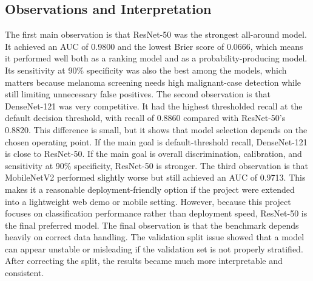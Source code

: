 \documentclass{article}
\begin{document}
\subsection{Observations and Interpretation}
The first main observation is that ResNet-50 was the strongest all-around model. It achieved an
AUC of 0.9800 and the lowest Brier score of 0.0666, which means it performed well both as a ranking
model and as a probability-producing model. Its sensitivity at 90\% specificity was also the best
among the models, which matters because melanoma screening needs high malignant-case detection
while still limiting unnecessary false positives.
The second observation is that DenseNet-121 was very competitive. It had the highest thresholded
recall at the default decision threshold, with recall of 0.8860 compared with ResNet-50's 0.8820.
This difference is small, but it shows that model selection depends on the chosen operating point.
If the main goal is default-threshold recall, DenseNet-121 is close to ResNet-50. If the main goal is
overall discrimination, calibration, and sensitivity at 90\% specificity, ResNet-50 is stronger.
The third observation is that MobileNetV2 performed slightly worse but still achieved an AUC of
0.9713. This makes it a reasonable deployment-friendly option if the project were extended into a
lightweight web demo or mobile setting. However, because this project focuses on classification
performance rather than deployment speed, ResNet-50 is the final preferred model.
The final observation is that the benchmark depends heavily on correct data handling. The validation
split issue showed that a model can appear unstable or misleading if the validation set is not properly
stratified. After correcting the split, the results became much more interpretable and consistent.
\end{document}
